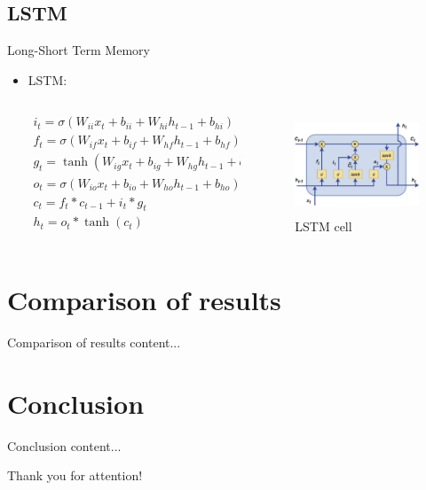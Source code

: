 \documentclass[aspectratio= 169]{beamer}
\begin{document}
		\subsection{LSTM}
		\begin{frame}{Long-Short Term Memory}
			\begin{itemize}
				\item LSTM:
				\begin{columns}
					\begin{column}{0.45\textwidth}
						$${
							\begin{array}{l}
								i_t = \sigma\left(W_{ii}x_t + b_{ii} + W_{hi}h_{t - 1} + b_{hi}\right)\\
								f_t = \sigma\left(W_{if}x_t + b_{if} + W_{hf} h_{t - 1} + b_{hf}\right)\\
								g_t = \tanh\left( W_{ig}x_t + b_{ig} + W_{hg}h_{t - 1} + b_{hg} \right)\\
								o_t = \sigma\left(W_{io}x_t + b_{io} + W_{ho}h_{t - 1} + b_{ho}\right)\\
								c_t = f_t * c_{t - 1} + i_t * g_t\\
								h_t  = o_t * \tanh\left(c_t\right)
							\end{array}
						}$$
					\end{column}
					\hfill
					\begin{column}{0.45\textwidth}
						\begin{figure}[H]
							\includegraphics[width= 4.5cm, height= 3cm]{LSTM_cell.jpg}
							\caption{LSTM cell}
						\end{figure}
					\end{column}
				\end{columns}
					
			\end{itemize}
		\end{frame}
	
	\section{Comparison of results}
	\begin{frame}{Comparison of results}
		content...
	\end{frame}

	\section{Conclusion}
	\begin{frame}{Conclusion}
		content...
	\end{frame}

	\begin{frame}
		\centering
		\LARGE
		Thank you for attention!
	\end{frame}
	
\end{document}
